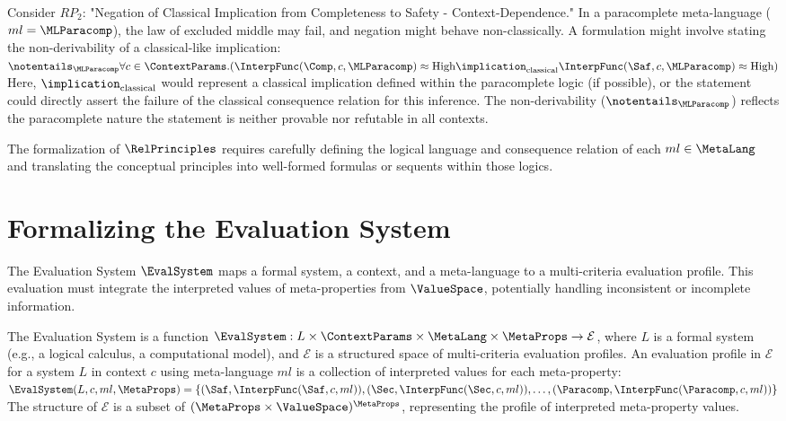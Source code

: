 											\begin{remark}
												\RaggedRight %
												Consider $RP_2$: "Negation of Classical Implication from Completeness to Safety - Context-Dependence." In a paracomplete meta-language ($ml = \MLParacomp$), the law of excluded middle may fail, and negation might behave non-classically. A formulation might involve stating the non-derivability of a classical-like implication:
												$\notentails_{\MLParacomp} \forall c \in \ContextParams . (\InterpFunc(\Comp, c, \MLParacomp) \approx \text{High} \implication_{\text{classical}} \InterpFunc(\Saf, c, \MLParacomp) \approx \text{High})$
												Here, $\implication_{\text{classical}}$ would represent a classical implication defined within the paracomplete logic (if possible), or the statement could directly assert the failure of the classical consequence relation for this inference. The non-derivability ($\notentails_{\MLParacomp}$) reflects the paracomplete nature \textendash  the statement is neither provable nor refutable in all contexts.
												\end{remark}
													
													The formalization of $\RelPrinciples$ requires carefully defining the logical language and consequence relation of each $ml \in \MetaLang$ and translating the conceptual principles into well-formed formulas or sequents within those logics.
													
													\section{Formalizing the Evaluation System}
													
													The Evaluation System $\EvalSystem$ maps a formal system, a context, and a meta-language to a multi-criteria evaluation profile. This evaluation must integrate the interpreted values of meta-properties from $\ValueSpace$, potentially handling inconsistent or incomplete information.
													
													\begin{definition}
														The Evaluation System is a function $\EvalSystem: L \times \ContextParams \times \MetaLang \times \MetaProps \rightarrow \mathcal{E}$, where $L$ is a formal system (e.g., a logical calculus, a computational model), and $\mathcal{E}$ is a structured space of multi-criteria evaluation profiles. An evaluation profile in $\mathcal{E}$ for a system $L$ in context $c$ using meta-language $ml$ is a collection of interpreted values for each meta-property:
														$\EvalSystem(L, c, ml, \MetaProps) = \{ (\Saf, \InterpFunc(\Saf, c, ml)), (\Sec, \InterpFunc(\Sec, c, ml)), \dots, (\Paracomp, \InterpFunc(\Paracomp, c, ml)) \}$
														The structure of $\mathcal{E}$ is a subset of $(\MetaProps \times \ValueSpace)^{\MetaProps}$, representing the profile of interpreted meta-property values.
														\end{definition}
															

